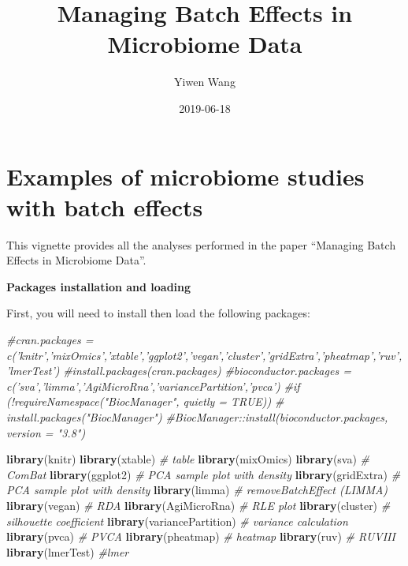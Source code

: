 \documentclass[]{book}
\title{Managing Batch Effects in Microbiome Data}
\author{Yiwen Wang}
\date{2019-06-18}
\newenvironment{Shaded}{\begin{snugshade}}{\end{snugshade}}
\newcommand{\KeywordTok}[1]{\textcolor[rgb]{0.13,0.29,0.53}{\textbf{#1}}}
\newcommand{\CommentTok}[1]{\textcolor[rgb]{0.56,0.35,0.01}{\textit{#1}}}
\newcommand{\NormalTok}[1]{#1}
\begin{document}
\maketitle

{
\setcounter{tocdepth}{3}
\tableofcontents
}
\chapter{Examples of microbiome studies with batch
effects}\label{examples-of-microbiome-studies-with-batch-effects}

This vignette provides all the analyses performed in the paper
``Managing Batch Effects in Microbiome Data''.

\textbf{Packages installation and loading}

First, you will need to install then load the following packages:

\begin{Shaded}
\begin{Highlighting}[]
\CommentTok{#cran.packages = c('knitr','mixOmics','xtable','ggplot2','vegan','cluster','gridExtra','pheatmap','ruv','lmerTest')}
\CommentTok{#install.packages(cran.packages)}
\CommentTok{#bioconductor.packages = c('sva','limma','AgiMicroRna','variancePartition','pvca')}
\CommentTok{#if (!requireNamespace("BiocManager", quietly = TRUE))}
\CommentTok{#    install.packages("BiocManager")}
\CommentTok{#BiocManager::install(bioconductor.packages, version = "3.8")}

\KeywordTok{library}\NormalTok{(knitr)}
\KeywordTok{library}\NormalTok{(xtable) }\CommentTok{# table}
\KeywordTok{library}\NormalTok{(mixOmics)}
\KeywordTok{library}\NormalTok{(sva) }\CommentTok{# ComBat}
\KeywordTok{library}\NormalTok{(ggplot2) }\CommentTok{# PCA sample plot with density}
\KeywordTok{library}\NormalTok{(gridExtra) }\CommentTok{# PCA sample plot with density}
\KeywordTok{library}\NormalTok{(limma) }\CommentTok{# removeBatchEffect (LIMMA)}
\KeywordTok{library}\NormalTok{(vegan) }\CommentTok{# RDA}
\KeywordTok{library}\NormalTok{(AgiMicroRna) }\CommentTok{# RLE plot}
\KeywordTok{library}\NormalTok{(cluster) }\CommentTok{# silhouette coefficient}
\KeywordTok{library}\NormalTok{(variancePartition) }\CommentTok{# variance calculation}
\KeywordTok{library}\NormalTok{(pvca) }\CommentTok{# PVCA}
\KeywordTok{library}\NormalTok{(pheatmap) }\CommentTok{# heatmap}
\KeywordTok{library}\NormalTok{(ruv) }\CommentTok{# RUVIII}
\KeywordTok{library}\NormalTok{(lmerTest) }\CommentTok{#lmer}
\end{Highlighting}
\end{Shaded}
\end{document}
